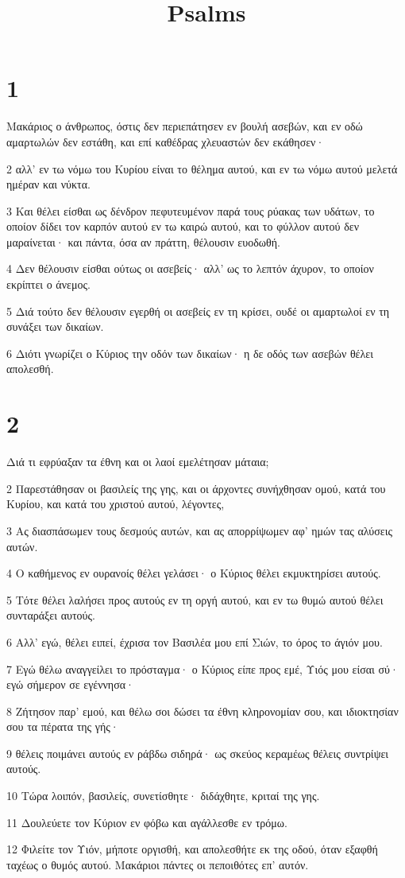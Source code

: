 

\title{Psalms}


\chapter{1}

\par Μακάριος ο άνθρωπος, όστις δεν περιεπάτησεν εν βουλή ασεβών, και εν οδώ αμαρτωλών δεν εστάθη, και επί καθέδρας χλευαστών δεν εκάθησεν·
\par 2 αλλ' εν τω νόμω του Κυρίου είναι το θέλημα αυτού, και εν τω νόμω αυτού μελετά ημέραν και νύκτα.
\par 3 Και θέλει είσθαι ως δένδρον πεφυτευμένον παρά τους ρύακας των υδάτων, το οποίον δίδει τον καρπόν αυτού εν τω καιρώ αυτού, και το φύλλον αυτού δεν μαραίνεται· και πάντα, όσα αν πράττη, θέλουσιν ευοδωθή.
\par 4 Δεν θέλουσιν είσθαι ούτως οι ασεβείς· αλλ' ως το λεπτόν άχυρον, το οποίον εκρίπτει ο άνεμος.
\par 5 Διά τούτο δεν θέλουσιν εγερθή οι ασεβείς εν τη κρίσει, ουδέ οι αμαρτωλοί εν τη συνάξει των δικαίων.
\par 6 Διότι γνωρίζει ο Κύριος την οδόν των δικαίων· η δε οδός των ασεβών θέλει απολεσθή.

\chapter{2}

\par Διά τι εφρύαξαν τα έθνη και οι λαοί εμελέτησαν μάταια;
\par 2 Παρεστάθησαν οι βασιλείς της γης, και οι άρχοντες συνήχθησαν ομού, κατά του Κυρίου, και κατά του χριστού αυτού, λέγοντες,
\par 3 Ας διασπάσωμεν τους δεσμούς αυτών, και ας απορρίψωμεν αφ' ημών τας αλύσεις αυτών.
\par 4 Ο καθήμενος εν ουρανοίς θέλει γελάσει· ο Κύριος θέλει εκμυκτηρίσει αυτούς.
\par 5 Τότε θέλει λαλήσει προς αυτούς εν τη οργή αυτού, και εν τω θυμώ αυτού θέλει συνταράξει αυτούς.
\par 6 Αλλ' εγώ, θέλει ειπεί, έχρισα τον Βασιλέα μου επί Σιών, το όρος το άγιόν μου.
\par 7 Εγώ θέλω αναγγείλει το πρόσταγμα· ο Κύριος είπε προς εμέ, Υιός μου είσαι σύ· εγώ σήμερον σε εγέννησα·
\par 8 Ζήτησον παρ' εμού, και θέλω σοι δώσει τα έθνη κληρονομίαν σου, και ιδιοκτησίαν σου τα πέρατα της γής·
\par 9 θέλεις ποιμάνει αυτούς εν ράβδω σιδηρά· ως σκεύος κεραμέως θέλεις συντρίψει αυτούς.
\par 10 Τώρα λοιπόν, βασιλείς, συνετίσθητε· διδάχθητε, κριταί της γης.
\par 11 Δουλεύετε τον Κύριον εν φόβω και αγάλλεσθε εν τρόμω.
\par 12 Φιλείτε τον Υιόν, μήποτε οργισθή, και απολεσθήτε εκ της οδού, όταν εξαφθή ταχέως ο θυμός αυτού. Μακάριοι πάντες οι πεποιθότες επ' αυτόν.

